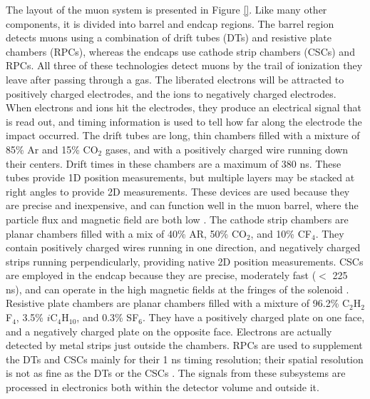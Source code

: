 
The layout of the muon system is presented in Figure \ref{}.
Like many other components, it is divided into barrel and endcap
regions. The barrel region detects muons using a combination of drift
tubes (DTs) and resistive plate chambers (RPCs), whereas the endcaps use cathode
strip chambers (CSCs) and RPCs. All three of these technologies detect
muons by the trail of ionization they leave after passing through a gas. The
liberated electrons will be attracted to positively charged
electrodes, and the ions to negatively charged electrodes. When
electrons and ions hit the electrodes, they produce an electrical
signal that is read out, and timing information
is used to tell how far along the electrode the impact occurred.
The drift tubes are long, thin chambers filled with a mixture of 85\%
Ar and 15\% CO$_2$ gases, and with a positively charged wire running
down their centers. Drift times in these chambers are a maximum of 380
ns. These tubes provide 1D position measurements, but multiple layers
may be stacked at right angles to
provide 2D measurements. These devices are used because they are precise
and inexpensive, and can function well in the muon barrel, where the
particle flux and magnetic field are both low
\cite{accelexper,websitedt}. The cathode strip chambers are planar
chambers filled with a mix of 40\% AR, 50\% CO$_2$, and 10\%
CF$_4$. They contain positively charged wires running in
one direction, and negatively charged strips running perpendicularly,
providing native 2D position measurements. CSCs are employed in the
endcap because they are precise, moderately fast ($<$ 225 ns), and can operate
in the high magnetic fields at the fringes of the solenoid
\cite{accelexper,websitecsc}. Resistive plate chambers are planar
chambers filled with a mixture of 96.2\% C$_2$H$_2$F$_4$, 3.5\%
$i$C$_4$H$_{10}$, and 0.3\% SF$_6$. They have a positively charged
plate on one face, and a negatively charged plate on the
opposite face. Electrons are actually detected by metal strips just outside
the chambers. RPCs are used to supplement the DTs and CSCs
mainly for their 1 ns timing resolution; their spatial
resolution is not as fine as the DTs or the CSCs
\cite{accelexper,websiterpc}. The signals from these subsystems are
processed in electronics both within the detector volume and outside it.


